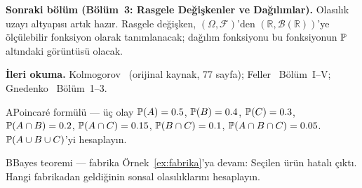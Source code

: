 \begin{kopru}
\textbf{Sonraki bölüm (Bölüm~3: Rasgele Değişkenler ve Dağılımlar).}
Olasılık uzayı altyapısı artık hazır. Rasgele değişken, $(\Omega,\mathcal{F})$'den
$(\mathbb{R},\mathcal{B}(\mathbb{R}))$'ye ölçülebilir fonksiyon olarak
tanımlanacak; dağılım fonksiyonu bu fonksiyonun $\mathbb{P}$ altındaki görüntüsü
olacak.

\medskip

\textbf{İleri okuma.}
Kolmogorov~\cite{kolmogorov1933} (orijinal kaynak, 77 sayfa);
Feller~\cite{feller1968vol1} Bölüm~I--V;
Gnedenko~\cite{gnedenko1962} Bölüm~1--3.
\end{kopru}



\cozumlualistirmalar

\begin{alistirma}[Al.2.1]{A}{Poincaré formülü --- üç olay}
$\mathbb{P}(A) = 0.5$, $\mathbb{P}(B) = 0.4$, $\mathbb{P}(C) = 0.3$,
$\mathbb{P}(A \cap B) = 0.2$, $\mathbb{P}(A \cap C) = 0.15$,
$\mathbb{P}(B \cap C) = 0.1$, $\mathbb{P}(A \cap B \cap C) = 0.05$.
$\mathbb{P}(A \cup B \cup C)$'yi hesaplayın.
\end{alistirma}

\begin{alistirma}[Al.2.2]{B}{Bayes teoremi --- fabrika}
Örnek~\ref{ex:fabrika}'ya devam: Seçilen ürün hatalı çıktı.
Hangi fabrikadan geldiğinin sonsal olasılıklarını hesaplayın.
\end{alistirma}

